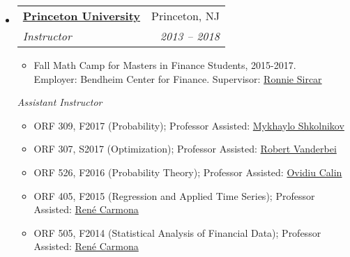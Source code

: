 \documentclass[letterpaper,11pt]{article}
\makeatletter
\newcommand{\resitem}[1]{\item #1 \vspace{-2pt}}
\newenvironment{widetable}[1]
	       {\begin{tabular*}{#1}[t]{l@{\extracolsep{\fill}}r}}
	       {\end{tabular*}}
\newcommand{\ressubheading}[4]{
  \begin{widetable}{\textwidth - 28pt}
		\textbf{#1} & #2 \\
		\textit{#3} & \textit{#4} \\
  \end{widetable}
  \vspace{-12pt}}
\makeatother
\begin{document}
\begin{itemize}
\item
  \ressubheading{\href{https://orfe.princeton.edu/courses}{Princeton University}}
		{Princeton, NJ}
		{Instructor}
		{2013 -- 2018}
		\begin{itemize}
			\item Fall Math Camp for Masters in Finance Students, 2015-2017. \\
			Employer: Bendheim Center for Finance. Supervisor: \href{https://www.princeton.edu/~sircar/}{Ronnie Sircar}
		\end{itemize}
		{\emph{Assistant Instructor}}
              	\begin{itemize}
                    \resitem{ORF 309, F2017 (Probability); Professor Assisted: \href{http://www.princeton.edu/~mykhaylo/}{Mykhaylo Shkolnikov}}
                    \resitem{ORF 307, S2017 (Optimization); Professor Assisted: \href{http://www.princeton.edu/~rvdb/}{Robert Vanderbei}}
                    \resitem{ORF 526, F2016 (Probability Theory); Professor Assisted: \href{https://people.emich.edu/ocalin/Home.htm}{Ovidiu Calin}}
                    \resitem{ORF 405, F2015 (Regression and Applied Time Series); Professor Assisted: \href{https://www.princeton.edu/~rcarmona/}{Ren\'{e} Carmona}}
                    \resitem{ORF 505, F2014 (Statistical Analysis of Financial Data); Professor Assisted: \href{https://www.princeton.edu/~rcarmona/}{Ren\'{e} Carmona}}
               	\end{itemize}


\end{itemize}
\end{document}
